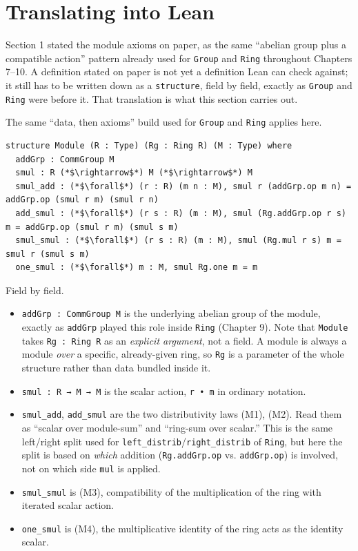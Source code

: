 \section{Translating into Lean}\label{sec:11-modules:02-translating-into-lean:1}

Section 1 stated the module axioms on paper, as the same ``abelian group plus a compatible action'' pattern already used for \texttt{Group} and \texttt{Ring} throughout Chapters 7--10. A definition stated on paper is not yet a definition Lean can check against; it still has to be written down as a \texttt{structure}, field by field, exactly as \texttt{Group} and \texttt{Ring} were before it. That translation is what this section carries out.

The same ``data, then axioms'' build used for \texttt{Group} and \texttt{Ring} applies here.

\begin{lstlisting}
structure Module (R : Type) (Rg : Ring R) (M : Type) where
  addGrp : CommGroup M
  smul : R (*$\rightarrow$*) M (*$\rightarrow$*) M
  smul_add : (*$\forall$*) (r : R) (m n : M), smul r (addGrp.op m n) = addGrp.op (smul r m) (smul r n)
  add_smul : (*$\forall$*) (r s : R) (m : M), smul (Rg.addGrp.op r s) m = addGrp.op (smul r m) (smul s m)
  smul_smul : (*$\forall$*) (r s : R) (m : M), smul (Rg.mul r s) m = smul r (smul s m)
  one_smul : (*$\forall$*) m : M, smul Rg.one m = m
\end{lstlisting}

Field by field.

\begin{itemize}
\tightlist
\item
  \texttt{addGrp : CommGroup M} is the underlying abelian group of the module, exactly as \texttt{addGrp} played this role inside \texttt{Ring} (Chapter 9). Note that \texttt{Module} takes \texttt{Rg : Ring R} as an \emph{explicit argument}, not a field. A module is always a module \emph{over} a specific, already-given ring, so \texttt{Rg} is a parameter of the whole structure rather than data bundled inside it.
\item
  \texttt{smul : R → M → M} is the scalar action, \texttt{r • m} in ordinary notation.
\item
  \texttt{smul\_\allowbreak{}add}, \texttt{add\_\allowbreak{}smul} are the two distributivity laws (M1), (M2). Read them as ``scalar over module-sum'' and ``ring-sum over scalar.'' This is the same left/right split used for \texttt{left\_\allowbreak{}distrib}/\texttt{right\_\allowbreak{}distrib} of \texttt{Ring}, but here the split is based on \emph{which} addition (\texttt{Rg.addGrp.op} vs. \texttt{addGrp.op}) is involved, not on which side \texttt{mul} is applied.
\item
  \texttt{smul\_\allowbreak{}smul} is (M3), compatibility of the multiplication of the ring with iterated scalar action.
\item
  \texttt{one\_\allowbreak{}smul} is (M4), the multiplicative identity of the ring acts as the identity scalar.
\end{itemize}

